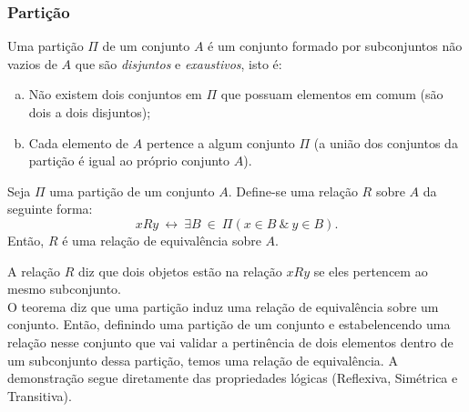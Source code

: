       \subsubsection{Partição}
         \begin{definition}
            Uma partição $\Pi$ de um conjunto $A$ é um conjunto formado por subconjuntos não vazios de $A$ que são \emph{disjuntos} e \emph{exaustivos}, isto é:
               \begin{enumerate}[a.]
                  \item Não existem dois conjuntos em $\Pi$ que possuam elementos em comum (são dois a dois disjuntos);
                  \item Cada elemento de $A$ pertence a algum conjunto $\Pi$ (a união dos conjuntos da partição é igual ao próprio conjunto $A$).
               \end{enumerate}
         \end{definition}
         \begin{theorem}\label{Particao}
            Seja $\Pi$ uma partição de um conjunto $A$. Define-se uma relação $R$ sobre $A$ da seguinte forma:
            $$xRy\ \leftrightarrow\ \exists B\ \in\ \Pi (x \in B\ \&\ y \in B).$$
            Então, $R$ é uma relação de equivalência sobre $A$.
         \end{theorem}
         A relação $R$ diz que dois objetos estão na relação $xRy$ se eles pertencem ao mesmo subconjunto.\\
         O teorema diz que uma partição induz uma relação de equivalência sobre um conjunto. Então, definindo uma partição de um conjunto e estabelencendo uma relação nesse conjunto que vai validar a pertinência de dois elementos dentro de um subconjunto dessa partição, temos uma relação de equivalência.
         A demonstração segue diretamente das propriedades lógicas (Reflexiva, Simétrica e Transitiva).
